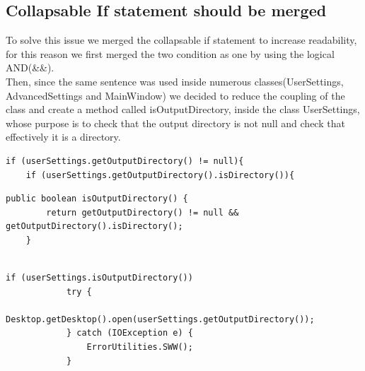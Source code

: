 \documentclass{article}
\begin{document}
\subsection{Collapsable If statement should be merged}
To solve this issue we merged the collapsable if statement to increase readability, for this reason we first merged the two condition as one by using the logical AND(&&).\\
Then, since the same sentence was used inside numerous classes(UserSettings, AdvancedSettings and MainWindow) we decided to reduce the coupling of the class and create a method called isOutputDirectory, inside the class UserSettings, whose purpose is to check that the output directory is not null and check that effectively it is a directory.
\begin{lstlisting}[caption={Old Implementation},captionpos=b]
if (userSettings.getOutputDirectory() != null){
    if (userSettings.getOutputDirectory().isDirectory()){
\end{lstlisting}


\begin{lstlisting}[caption={New Implementation},captionpos=b]
public boolean isOutputDirectory() {
        return getOutputDirectory() != null && getOutputDirectory().isDirectory();
    }
    
\end{lstlisting}

\begin{lstlisting}[caption={Application of the new implementation},captionpos=b]
if (userSettings.isOutputDirectory())
            try {
                Desktop.getDesktop().open(userSettings.getOutputDirectory());
            } catch (IOException e) {
                ErrorUtilities.SWW();
            }
\end{lstlisting}

\end{document}

